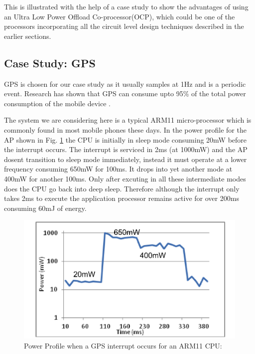 \documentclass[conference]{IEEEtran}
\begin{document}
This is illustrated with the help of a case study to show the advantages of
using an Ultra Low Power Offload Co-processor(OCP), which could be one of the
processors incorporating all the circuit level design techniques described in the earlier sections.

\subsection{Case Study: GPS}

GPS is chosen for our case study as it usually samples at 1Hz and is a periodic
event. Research has shown that GPS can consume upto 95\% of the total power
consumption of the mobile device \cite{b7}.

The system we are considering here is a typical ARM11 micro-processor which is
commonly found in most mobile phones these days. In the power profile for the AP shown in Fig. \ref{fig:Power_profile_ARM11} the CPU is initially in sleep mode
consuming 20mW before the interrupt occurs. The interrupt is serviced in 2ms (at
1000mW) and the AP dosent transition to sleep mode immediately, instead it must operate
at a lower frequency consuming 650mW for 100ms. It drops into yet another mode at
400mW for another 100ms. Only after excuting in all these intermediate modes
does the CPU go back into deep sleep. Therefore although the interrupt only
takes 2ms to execute the application processor remains active for over 200ms
consuming 60mJ of energy.

\begin{figure}[htbp]
	\includegraphics[width=\linewidth]{img/Pictures/Power_profile_ARM11.png}
	\centering
    \caption{Power Profile when a GPS interrupt occurs for an ARM11 CPU: \cite{b2}}
    \label{fig:Power_profile_ARM11}
\end{figure}
\end{document}
